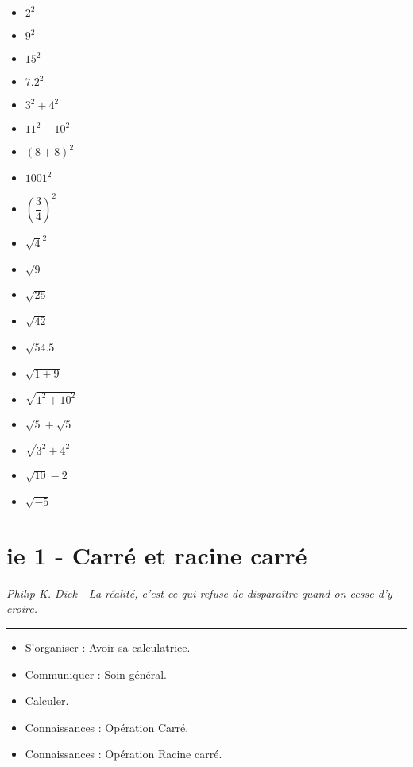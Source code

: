 \documentclass[12pt]{article}
\newcommand{\horrule}[1]{\rule{\linewidth}{#1}} %
\begin{document}
\begin{multicols}{2}

\begin{itemize}
\item $2^2$
\item $9^2$
\item $15^2$
\item $7.2^2$
\item $3^2 + 4^2$
\item $11^2 -10^2$
\item $(8+8)^2$
\item $1001^2$
\item $\left( \dfrac{3}{4} \right)^2$
\item $\sqrt{4}^2$
\end{itemize}

\begin{itemize}
\item $\sqrt{9}$
\item $\sqrt{25}$
\item $\sqrt{42}$
\item $\sqrt{54.5}$
\item $\sqrt{1+9}$
\item $\sqrt{1^2 +10^2}$
\item $\sqrt{5} + \sqrt{5}$
\item $\sqrt{3^2 + 4^2}$
\item $\sqrt{10} - 2$
\item $\sqrt{-5}$
\end{itemize}

\end{multicols}

\vspace{0.5cm}

\section*{ie 1 - Carré et racine carré}
\begin{center}
\textit{Philip K. Dick - La réalité, c'est ce qui refuse de disparaître quand on cesse d'y croire.}
\end{center}
\horrule{2px}

\begin{multicols}{2}
\begin{itemize}
\item S'organiser : Avoir sa calculatrice.
\item Communiquer : Soin général.
\item Calculer.
\item Connaissances : Opération Carré.
\item Connaissances : Opération Racine carré.
\end{itemize}
\end{multicols}
\end{document}
